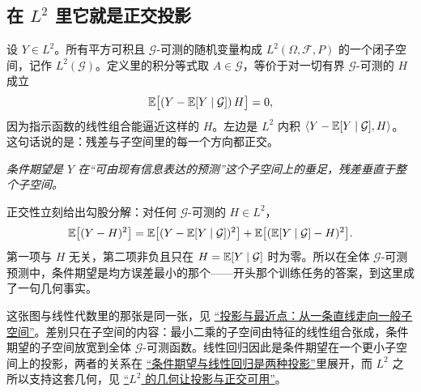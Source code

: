 \subsection{在 \texorpdfstring{\(L^2\)}{L2} 里它就是正交投影}

设 \(Y\in L^2\)。所有平方可积且 \(\mathcal G\)-可测的随机变量构成 \(L^2(\Omega,\mathcal F,P)\) 的一个闭子空间，记作 \(L^2(\mathcal G)\)。定义里的积分等式取 \(A\in\mathcal G\)，等价于对一切有界 \(\mathcal G\)-可测的 \(H\) 成立
\[
\mathbb{E}\bigl[(Y-\mathbb{E}[Y\mid\mathcal G])\,H\bigr]=0,
\]
因为指示函数的线性组合能逼近这样的 \(H\)。左边是 \(L^2\) 内积 \(\left\langle Y-\mathbb{E}[Y\mid\mathcal G],H\right\rangle\)。这句话说的是：残差与子空间里的每一个方向都正交。

\begin{center}
\end{center}

\emph{条件期望是 \(Y\) 在``可由现有信息表达的预测''这个子空间上的垂足，残差垂直于整个子空间。}

正交性立刻给出勾股分解：对任何 \(\mathcal G\)-可测的 \(H\in L^2\)，
\[
\mathbb{E}\bigl[(Y-H)^2\bigr]
=\mathbb{E}\bigl[(Y-\mathbb{E}[Y\mid\mathcal G])^2\bigr]
+\mathbb{E}\bigl[(\mathbb{E}[Y\mid\mathcal G]-H)^2\bigr].
\]
第一项与 \(H\) 无关，第二项非负且只在 \(H=\mathbb{E}[Y\mid\mathcal G]\) 时为零。所以在全体 \(\mathcal G\)-可测预测中，条件期望是均方误差最小的那个——开头那个训练任务的答案，到这里成了一句几何事实。

这张图与线性代数里的那张是同一张，见 \hyperref[sec:03-Linear-Algebra/03-Orthogonality/02]{``投影与最近点：从一条直线走向一般子空间''}。差别只在子空间的内容：最小二乘的子空间由特征的线性组合张成，条件期望的子空间放宽到全体 \(\mathcal G\)-可测函数。线性回归因此是条件期望在一个更小子空间上的投影，两者的关系在 \hyperref[sec:12-Real-Analysis-Support/07-Lp-Spaces-and-Function-Geometry/04]{``条件期望与线性回归是两种投影''}里展开，而 \(L^2\) 之所以支持这套几何，见 \hyperref[sec:12-Real-Analysis-Support/07-Lp-Spaces-and-Function-Geometry/03]{``\(L^2\) 的几何让投影与正交可用''}。

